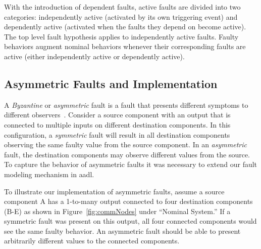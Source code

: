 With the introduction of dependent faults, active faults are divided into two categories: independently active (activated by its own triggering event) and dependently active (activated when the faults they depend on become active). The top level fault hypothesis applies to independently active faults. Faulty behaviors augment nominal behaviors whenever their corresponding faults are active (either independently active or dependently active).

\subsection{Asymmetric Faults and Implementation}
A \textit{Byzantine} or \textit{asymmetric} fault is a fault that presents different symptoms to different observers~\cite{Driscoll-Byzantine-Fault}. 
Consider a source component with an output that is connected to multiple inputs on different destination components. In this configuration, a \textit{symmetric} fault will result in all destination components observing the same faulty value from the source component. In an {\em asymmetric} fault, the destination components may observe different values from the source.  To capture the behavior of asymmetric faults %
it was necessary to extend our fault modeling mechanism in \gls{aadl}. 

To illustrate our implementation of asymmetric faults, assume a source component A has a 1-to-many output connected to four destination components (B-E) as shown in Figure~\ref{fig:commNodes} under ``Nominal System.'' If a symmetric fault was present on this output, all four connected components would see the same faulty behavior. An asymmetric fault should be able to present arbitrarily different values to the connected components. 

